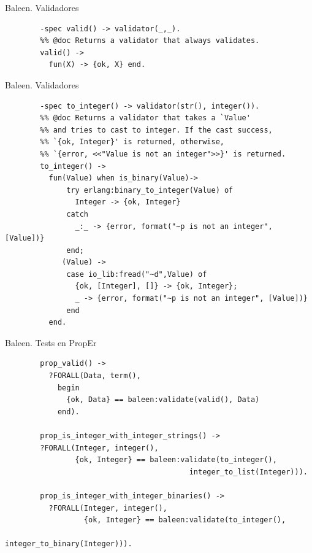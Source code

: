 \documentclass{beamer}
\begin{document}
    \begin{frame}[fragile]{Baleen. Validadores}
      \begin{verbatim}
        -spec valid() -> validator(_,_).
        %% @doc Returns a validator that always validates.
        valid() ->
          fun(X) -> {ok, X} end.
      \end{verbatim}
    \end{frame}

    \begin{frame}[fragile]{Baleen. Validadores}
      \begin{verbatim}
        -spec to_integer() -> validator(str(), integer()).
        %% @doc Returns a validator that takes a `Value'
        %% and tries to cast to integer. If the cast success,
        %% `{ok, Integer}' is returned, otherwise,
        %% `{error, <<"Value is not an integer">>}' is returned.
        to_integer() ->
          fun(Value) when is_binary(Value)->
              try erlang:binary_to_integer(Value) of
                Integer -> {ok, Integer}
              catch
                _:_ -> {error, format("~p is not an integer", [Value])}
              end;
             (Value) ->
              case io_lib:fread("~d",Value) of
                {ok, [Integer], []} -> {ok, Integer};
                _ -> {error, format("~p is not an integer", [Value])}
              end
          end.
      \end{verbatim}
    \end{frame}

    \begin{frame}[fragile]{Baleen. Tests en PropEr}
      \begin{verbatim}
        prop_valid() ->
          ?FORALL(Data, term(),
            begin
              {ok, Data} == baleen:validate(valid(), Data)
            end).

        prop_is_integer_with_integer_strings() ->
        ?FORALL(Integer, integer(),
                {ok, Integer} == baleen:validate(to_integer(),
                                          integer_to_list(Integer))).

        prop_is_integer_with_integer_binaries() ->
          ?FORALL(Integer, integer(),
                  {ok, Integer} == baleen:validate(to_integer(),
                                          integer_to_binary(Integer))).
      \end{verbatim}
    \end{frame}
\end{document}
